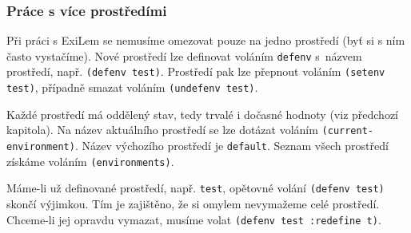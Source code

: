 \subsubsection{Práce s více prostředími}
\label{multiple environments}
Při práci s ExiLem se nemusíme omezovat pouze na jedno prostředí (byť si s ním
často vystačíme). Nové prostředí lze definovat voláním \verb|defenv| s~názvem
prostředí, např. \verb|(defenv test)|. Prostředí pak lze přepnout voláním
\verb|(setenv test)|, případně smazat voláním \verb|(undefenv test)|.

Každé prostředí má oddělený stav, tedy trvalé i dočasné hodnoty (viz předchozí
kapitola). Na název aktuálního prostředí se lze dotázat voláním
\verb|(current-environment)|. Název výchozího prostředí je \verb|default|.
Seznam všech prostředí získáme voláním \verb|(environments)|.

Máme-li už definované prostředí, např. \verb|test|, opětovné volání
\verb|(defenv test)| skončí výjimkou. Tím je zajištěno, že si omylem nevymažeme
celé prostředí.  Chceme-li jej opravdu vymazat, musíme volat
\verb|(defenv test :redefine t)|.
